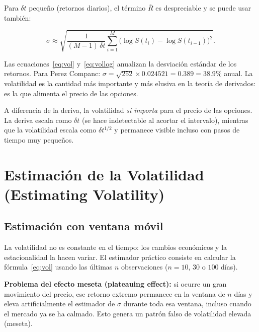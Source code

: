 \documentclass[12pt]{article}
\begin{document}
Para $\delta t$ peque\~no (retornos diarios), el t\'ermino $\overline{R}$ es
despreciable y se puede usar tambi\'en:

\begin{equation}
  \sigma \approx \sqrt{\frac{1}{(M-1)\,\delta t}\sum_{i=1}^{M}
  \bigl(\log S(t_i) - \log S(t_{i-1})\bigr)^2}.
  \label{eq:vollog}
\end{equation}

\begin{intuicionmat}
Las ecuaciones~\eqref{eq:vol} y~\eqref{eq:vollog} anualizan la desviaci\'on est\'andar
de los retornos. Para Perez Companc: $\sigma = \sqrt{252} \times 0.024521 = 0.389 = 38.9\%$
anual. La volatilidad es la cantidad m\'as importante y m\'as elusiva en la teor\'ia
de derivados: es la que alimenta el precio de las opciones.
\end{intuicionmat}

\begin{intuicion}
A diferencia de la deriva, la volatilidad \emph{s\'i importa} para el precio de las
opciones. La deriva escala como $\delta t$ (se hace indetectable al acortar el intervalo),
mientras que la volatilidad escala como $\delta t^{1/2}$ y permanece visible incluso
con pasos de tiempo muy peque\~nos.
\end{intuicion}

\section{Estimaci\'on de la Volatilidad (Estimating Volatility)}

\subsection{Estimaci\'on con ventana m\'ovil}

La volatilidad no es constante en el tiempo: los cambios econ\'omicos y la
estacionalidad la hacen variar. El estimador pr\'actico consiste en calcular
la f\'ormula~\eqref{eq:vol} usando las \'ultimas $n$ observaciones
($n = 10$, $30$ o $100$ d\'ias).

\textbf{Problema del efecto meseta (plateauing effect):} si ocurre un gran
movimiento del precio, ese retorno extremo permanece en la ventana de $n$ d\'ias
y eleva artificialmente el estimador de $\sigma$ durante toda esa ventana, incluso
cuando el mercado ya se ha calmado. Esto genera un patr\'on falso de volatilidad
elevada (meseta).
\end{document}
